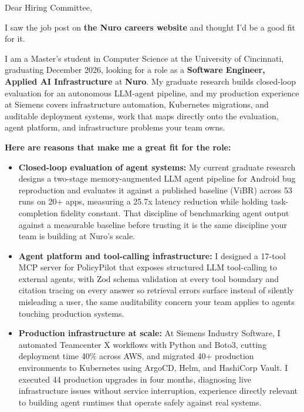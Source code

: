 \documentclass[11pt]{letter}
\date{}
\begin{document}
\begin{letter}{}

\opening{Dear Hiring Committee,}

I saw the job post on \textbf{the Nuro careers website} and thought I'd be a good fit for it.

I am a Master's student in Computer Science at the University of Cincinnati, graduating December 2026, looking for a role as a \textbf{Software Engineer, Applied AI Infrastructure} at \textbf{Nuro}. My graduate research builds closed-loop evaluation for an autonomous LLM-agent pipeline, and my production experience at Siemens covers infrastructure automation, Kubernetes migrations, and auditable deployment systems, work that maps directly onto the evaluation, agent platform, and infrastructure problems your team owns.

\textbf{Here are reasons that make me a great fit for the role:}

\begin{itemize}[leftmargin=*, itemsep=0.45em]
    \item \textbf{Closed-loop evaluation of agent systems:} My current graduate research designs a two-stage memory-augmented LLM agent pipeline for Android bug reproduction and evaluates it against a published baseline (ViBR) across 53 runs on 20+ apps, measuring a 25.7x latency reduction while holding task-completion fidelity constant. That discipline of benchmarking agent output against a measurable baseline before trusting it is the same discipline your team is building at Nuro's scale.

    \item \textbf{Agent platform and tool-calling infrastructure:} I designed a 17-tool MCP server for PolicyPilot that exposes structured LLM tool-calling to external agents, with Zod schema validation at every tool boundary and citation tracing on every answer so retrieval errors surface instead of silently misleading a user, the same auditability concern your team applies to agents touching production systems.

    \item \textbf{Production infrastructure at scale:} At Siemens Industry Software, I automated Teamcenter X workflows with Python and Boto3, cutting deployment time 40\% across AWS, and migrated 40+ production environments to Kubernetes using ArgoCD, Helm, and HashiCorp Vault. I executed 44 production upgrades in four months, diagnosing live infrastructure issues without service interruption, experience directly relevant to building agent runtimes that operate safely against real systems.


\end{itemize}
\end{letter}
\end{document}

